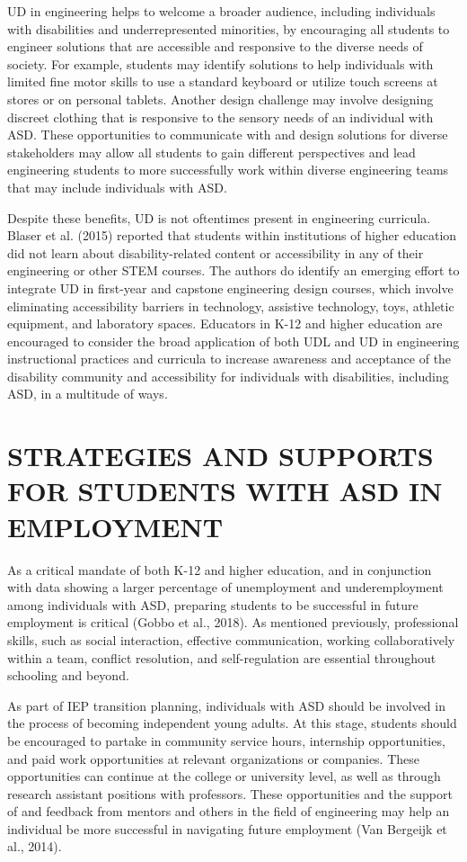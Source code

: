\documentclass[11.5pt]{sig-alternate}
\begin{document}
\begin{large}
UD in engineering helps to welcome a broader audience, including individuals with disabilities and underrepresented minorities, by encouraging all students to engineer solutions that are accessible and responsive to the diverse needs of society. For example, students may identify solutions to help individuals with limited fine motor skills to use a standard keyboard or utilize touch screens at stores or on personal tablets. Another design challenge may involve designing discreet clothing that is responsive to the sensory needs of an individual with ASD.  These opportunities to communicate with and design solutions for diverse stakeholders may allow all students to gain different perspectives and lead engineering students to more successfully work within diverse engineering teams that may include individuals with ASD.

Despite these benefits, UD is not oftentimes present in engineering curricula. Blaser et al. (2015) reported that students within institutions of higher education did not learn about disability-related content or accessibility in any of their engineering or other STEM courses. The authors do identify an emerging effort to integrate UD in first-year and capstone engineering design courses, which involve eliminating accessibility barriers in technology, assistive technology, toys, athletic equipment, and laboratory spaces. Educators in K-12 and higher education are encouraged to consider the broad application of both UDL and UD in engineering instructional practices and curricula to increase awareness and acceptance of the disability community and accessibility for individuals with disabilities, including ASD, in a multitude of ways.

\section*{STRATEGIES AND SUPPORTS FOR STUDENTS WITH ASD IN EMPLOYMENT}

As a critical mandate of both K-12 and higher education, and in conjunction with data showing a larger percentage of unemployment and underemployment among individuals with ASD, preparing students to be successful in future employment is critical (Gobbo et al., 2018). As mentioned previously, professional skills, such as social interaction, effective communication, working collaboratively within a team, conflict resolution, and self-regulation are essential throughout schooling and beyond. 

As part of IEP transition planning, individuals with ASD should be involved in the process of becoming independent young adults. At this stage, students should be encouraged to partake in community service hours, internship opportunities, and paid work opportunities at relevant organizations or companies. These opportunities can continue at the college or university level, as well as through research assistant positions with professors. These opportunities and the support of and feedback from mentors and others in the field of engineering may help an individual be more successful in navigating future employment (Van Bergeijk et al., 2014). 


\end{large}
\end{document}

